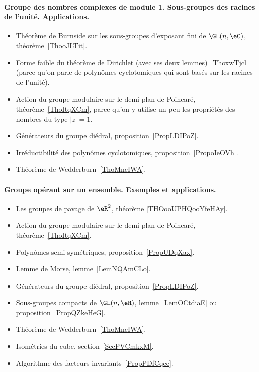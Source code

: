 \paragraph{Groupe des nombres complexes de module 1. Sous-groupes des racines de l'unité. Applications.}
\begin{itemize}
    \item Théorème de Burnside sur les sous-groupes d'exposant fini de \( \GL(n,\eC)\), théorème~\ref{ThooJLTit}.
    \item Forme faible du théorème de Dirichlet (avec ses deux lemmes)~\ref{ThoxwTjcl} (parce qu'on parle de polynômes cyclotomiques qui sont basés sur les racines de l'unité).
    \item Action du groupe modulaire sur le demi-plan de Poincaré, théorème~\ref{ThoItqXCm}, parce qu'on y utilise un peu les propriétés des nombres du type \( | z |=1\).
    \item Générateurs du groupe diédral, proposition~\ref{PropLDIPoZ}.
    \item Irréductibilité des polynômes cyclotomiques, proposition~\ref{PropoIeOVh}.
    \item Théorème de Wedderburn~\ref{ThoMncIWA}.
\end{itemize}
\paragraph{Groupe opérant sur un ensemble. Exemples et applications.}
\begin{itemize}
    \item Les groupes de pavage de \( \eR^2\), théorème \ref{THOooUPHQooYfeHAy}.
    \item Action du groupe modulaire sur le demi-plan de Poincaré, théorème~\ref{ThoItqXCm}.
    \item Polynômes semi-symétriques, proposition~\ref{PropUDqXax}.
    \item Lemme de Morse, lemme~\ref{LemNQAmCLo}.
    \item Générateurs du groupe diédral, proposition~\ref{PropLDIPoZ}.
    \item Sous-groupes compacts de \( \GL(n,\eR)\), lemme~\ref{LemOCtdiaE} ou proposition~\ref{PropQZkeHeG}.
    \item Théorème de Wedderburn~\ref{ThoMncIWA}.
    \item Isométries du cube, section~\ref{SecPVCmkxM}.
    \item Algorithme des facteurs invariants~\ref{PropPDfCqee}.
\end{itemize}


